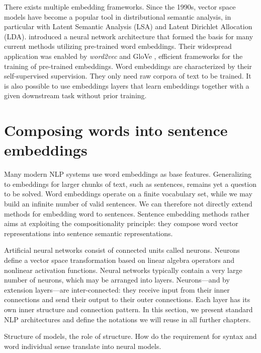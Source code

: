 There exists multiple embedding frameworks. Since the 1990s, vector space models have become a popular tool in distributional semantic analysis, in particular with Latent Semantic Analysis (LSA) and Latent Dirichlet Allocation (LDA). \textcite{collobert_08} introduced a neural network architecture that formed the basis for many current methods utilizing pre-trained word embeddings. Their widespread application was enabled by \textsl{word2vec} \parencite{mikolov_13a, mikolov_13b} and GloVe \parencite{pennington_14}, efficient frameworks for the training of pre-trained embeddings. Word embeddings are characterized by their self-supervised supervision. They only need raw corpora of text to be trained. It is also possible to use embeddings layers that learn embeddings together with a given downstream task without prior training.

\section{Composing words into sentence embeddings}

Many modern NLP systems use word embeddings as base features. Generalizing to embeddings for larger chunks of text, such as sentences, remains yet a question to be solved. Word embeddings operate on a finite vocabulary set, while we may build an infinite number of valid sentences. We can therefore not directly extend methods for embedding word to sentences. Sentence embedding methods rather aims at exploiting the compositionality principle: they compose word vector representations into sentence semantic representations.

Artificial neural networks consist of connected units called neurons. Neurons define a vector space transformation based on linear algebra operators and nonlinear activation functions. Neural networks typically contain a very large number of neurons, which may be arranged into layers. Neurons—and by extension layers—are inter-connected: they receive input from their inner connections and send their output to their outer connections. Each layer has its own inner structure and connection pattern. In this section, we present standard NLP architectures and define the notations we will reuse in all further chapters.


Structure of models, the role of structure. How do the requirement for syntax and word individual sense translate into neural models.

